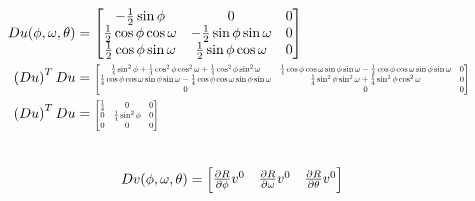 \documentclass[12pt]{article}
\newcommand*{\Scale}[2][4]{\scalebox{#1}{$#2$}}%
\begin{document}
\begin{align}
  Du(\phi, \omega, \theta) &= \begin{bmatrix} -\frac{1}{2}\sin\phi & 0 & 0 \\ \frac{1}{2}\cos\phi\cos\omega & -\frac{1}{2}\sin\phi\sin\omega & 0 \\  \frac{1}{2}\cos\phi\sin\omega & \frac{1}{2}\sin\phi\cos\omega & 0\end{bmatrix} \\
  \left(Du\right)^TDu &= \Scale[0.60]{\begin{bmatrix} 
\frac{1}{4}\sin^2\phi + \frac{1}{4}\cos^2\phi\cos^2\omega+ \frac{1}{4}\cos^2\phi\sin^2\omega
&  \frac{1}{4}\cos\phi\cos\omega\sin\phi\sin\omega - \frac{1}{4}\cos\phi\cos\omega\sin\phi\sin\omega 
& 0 
\\ \frac{1}{4}\cos\phi\cos\omega\sin\phi\sin\omega - \frac{1}{4}\cos\phi\cos\omega\sin\phi\sin\omega 
& \frac{1}{4}\sin^2\phi\sin^2\omega + \frac{1}{4}\sin^2\phi\cos^2\omega
& 0
\\ 0
& 0
& 0 \end{bmatrix}} \\
  \left(Du\right)^TDu &= \Scale[0.60]{\begin{bmatrix} 
\frac{1}{4}
& 0
& 0 
\\ 0 
& \frac{1}{4}\sin^2\phi
& 0
\\ 0
& 0
& 0 \end{bmatrix}}
\end{align} \\


\begin{align}
Dv(\phi, \omega, \theta) &= \Scale[1.0]{\begin{bmatrix}
\frac{\partial R}{\partial\phi}v^0 & \frac{\partial R}{\partial\omega}v^0 & \frac{\partial R}{\partial\theta}v^0 
\end{bmatrix}}
\end{align}
\end{document}
